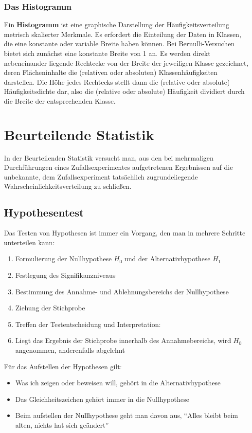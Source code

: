 \documentclass[a4paper,10pt,DIV9, BCOR12mm, oneside,openright,openbib]{scrreprt}
\theoremstyle{definition}
\theoremstyle{plain}
\begin{document}
\subsubsection{Das Histogramm}
Ein \textbf{Histogramm} ist eine graphische Darstellung der Häufigkeitsverteilung metrisch skalierter Merkmale. Es erfordert die Einteilung der Daten in Klassen, die eine konstante oder variable Breite haben können. Bei Bernulli-Versuchen bietet sich zunächst eine konstante Breite von 1 an. Es werden direkt nebeneinander liegende Rechtecke von der Breite der jeweiligen Klasse gezeichnet, deren Flächeninhalte die (relativen oder absoluten) Klassenhäufigkeiten darstellen. Die Höhe jedes Rechtecks stellt dann die (relative oder absolute) Häufigkeitsdichte dar, also die (relative oder absolute) Häufigkeit dividiert durch die Breite der entsprechenden Klasse.

\section{Beurteilende Statistik}
In der Beurteilenden Statistik versucht man, aus den bei mehrmaligen Durchführungen eines Zufallsexperimentes aufgetretenen Ergebnissen auf die unbekannte, dem Zufallsexperiment tatsächlich zugrundeliegende Wahrscheinlichkeitsverteilung zu schließen.

\subsection{Hypothesentest}
 Das Testen von Hypothesen ist immer ein Vorgang, den man in mehrere Schritte unterteilen kann:

  \begin{enumerate}
    \item Formulierung der Nullhypothese $H_{0}$ und der Alternativhypothese $H_{1}$
    \item Festlegung des Signifikanzniveaus
    \item Bestimmung des Annahme- und Ablehnungsbereichs der Nullhypothese
    \item Ziehung der Stichprobe
    \item Treffen der Testentscheidung und Interpretation:
    \item Liegt das Ergebnis der Stichprobe innerhalb des Annahmebereichs, wird $H_{0}$ angenommen, anderenfalls abgelehnt
  \end{enumerate}

  Für das Aufstellen der Hypothesen gilt:
  \begin{itemize}
    \item Was ich zeigen oder beweisen will, gehört in die Alternativhypothese
    \item Das Gleichheitszeichen gehört immer in die Nullhypothese
    \item Beim aufstellen der Nullhypothese geht man davon aus, ``Alles bleibt beim alten, nichts hat sich geändert''
  \end{itemize}
\end{document}
